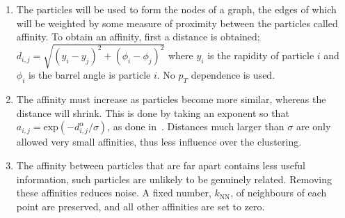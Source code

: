     \begin{enumerate}
        \item \label{step:start} The particles will be used to form the nodes of a graph,
        the edges of which will be weighted by some measure of proximity between the particles called affinity.
        To obtain an affinity, first a distance is obtained; \(d_{i,j} = \sqrt{(y_i - y_j)^2 + (\phi_i - \phi_j)^2}\)
        where \(y_i\) is the rapidity of particle \(i\) and \(\phi_i\) is the barrel angle is particle \(i\).
        No \(p_T\) dependence is used.

    \item \label{step:affinity} The affinity must increase as particles become more similar, whereas the distance will shrink.
            This is done by taking an exponent so that \(a_{i,j} = \text{exp}(-d_{i,j}^\alpha/\sigma)\), as done in~\cite{hadjighasem2016votex}. %
            Distances much larger than \(\sigma\) are only allowed very small affinities,
            thus less influence over the clustering.
    \item\label{step:KNN} The affinity between particles that are far apart contains less useful information,
        such particles are unlikely to be genuinely related.
        Removing these affinities reduces noise.
    A fixed number, \(k_\text{NN}\), of neighbours of each point are
    preserved, and all other affinities are set to zero.


\end{enumerate}
